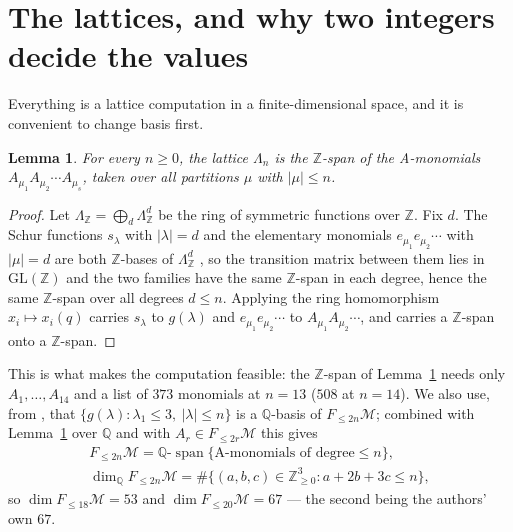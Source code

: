 \documentclass[11pt]{amsart}
\newtheorem{lemma}[theorem]{Lemma}
\theoremstyle{remark}
\newcommand{\Mm}{\mathcal M}
\newcommand{\Lam}{\Lambda}
\DeclareMathOperator{\Span}{span}
\begin{document}
\section{The lattices, and why two integers decide the values}

Everything is a lattice computation in a finite-dimensional space, and it is convenient to change
basis first.

\begin{lemma}\label{lem:basis}
For every $n\ge0$, the lattice $\Lam_n$ is the $\mathbb Z$-span of the
\emph{A-monomials} $A_{\mu_1}A_{\mu_2}\cdots A_{\mu_s}$, taken over all
partitions $\mu$ with $|\mu|\le n$.
\end{lemma}

\begin{proof}
Let $\Lam_{\mathbb Z}=\bigoplus_d\Lam^d_{\mathbb Z}$ be the ring of symmetric functions over
$\mathbb Z$. Fix $d$. The Schur functions $s_\lambda$ with $|\lambda|=d$ and the
elementary monomials $e_{\mu_1}e_{\mu_2}\cdots$ with $|\mu|=d$ are both
$\mathbb Z$-bases of $\Lam^d_{\mathbb Z}$ \cite{Mac}, so the transition matrix
between them lies in $\mathrm{GL}(\mathbb Z)$ and the
two families have the same $\mathbb Z$-span in each degree, hence the same $\mathbb Z$-span over all
degrees $d\le n$. Applying the ring homomorphism $x_i\mapsto x_i(q)$ carries $s_\lambda$ to
$g(\lambda)$ and $e_{\mu_1}e_{\mu_2}\cdots$ to $A_{\mu_1}A_{\mu_2}\cdots$, and carries a
$\mathbb Z$-span onto a $\mathbb Z$-span.
\end{proof}

This is what makes the computation feasible: the $\mathbb Z$-span of Lemma~\ref{lem:basis} needs
only $A_1,\dots,A_{14}$ and a list of $373$ monomials at $n=13$ ($508$ at $n=14$). We also use,
from \cite{BY}, that $\{g(\lambda):\lambda_1\le3,\ |\lambda|\le n\}$ is a $\mathbb Q$-basis of
$F_{\le2n}\Mm$; combined with Lemma~\ref{lem:basis} over $\mathbb Q$ and with
$A_r\in F_{\le2r}\Mm$ this gives
\begin{equation}\label{eq:dim}
\begin{gathered}
 F_{\le2n}\Mm=\mathbb Q\text{-}\Span\{\text{A-monomials of degree}\le n\},\\
 \dim_{\mathbb Q}F_{\le2n}\Mm=\#\{(a,b,c)\in\mathbb Z_{\ge0}^3:a+2b+3c\le n\},
\end{gathered}
\end{equation}
so $\dim F_{\le18}\Mm=53$ and $\dim F_{\le20}\Mm=67$ --- the second being the authors' own $67$.
\end{document}
